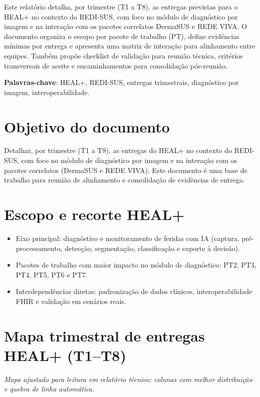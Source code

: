 \documentclass[
    12pt,
    openright,
    oneside,
    a4paper,
    chapter=TITLE,
    section=TITLE,
    brazil,
    sumario=tradicional,
    hidelinks
]{abntex2}
\begin{document}
\imprimircapa
\imprimirfolhaderosto*

\begin{resumo}
Este relatório detalha, por trimestre (T1 a T8), as entregas previstas para o HEAL+ no contexto do REDI-SUS, com foco no módulo de diagnóstico por imagem e na interação com os pacotes correlatos DermaSUS e REDE VIVA. O documento organiza o escopo por pacote de trabalho (PT), define evidências mínimas por entrega e apresenta uma matriz de interação para alinhamento entre equipes. Também propõe checklist de validação para reunião técnica, critérios transversais de aceite e encaminhamentos para consolidação pós-reunião.

\textbf{Palavras-chave}: HEAL+, REDI-SUS, entregas trimestrais, diagnóstico por imagem, interoperabilidade.
\end{resumo}

\tableofcontents*
\cleardoublepage

\textual

\section{Objetivo do documento}
Detalhar, por trimestre (T1 a T8), as entregas do HEAL+ no contexto do REDI-SUS, com foco no módulo de diagnóstico por imagem e na interação com os pacotes correlatos (DermaSUS e REDE VIVA). Este documento é uma base de trabalho para reunião de alinhamento e consolidação de evidências de entrega.

\section{Escopo e recorte HEAL+}
\begin{itemize}
    \item Eixo principal: diagnóstico e monitoramento de feridas com IA (captura, pré-processamento, detecção, segmentação, classificação e suporte à decisão).
    \item Pacotes de trabalho com maior impacto no módulo de diagnóstico: PT2, PT3, PT4, PT5, PT6 e PT7.
    \item Interdependências diretas: padronização de dados clínicos, interoperabilidade FHIR e validação em cenários reais.
\end{itemize}

\section{Mapa trimestral de entregas HEAL+ (T1--T8)}
\noindent\textit{Mapa ajustado para leitura em relatório técnico: colunas com melhor distribuição e quebra de linha automática.}
\end{document}
